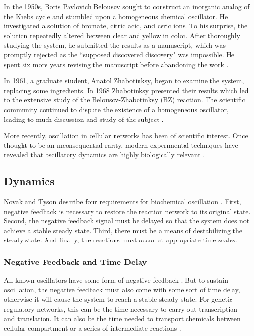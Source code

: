 \documentclass[12pt]{report}
\begin{document}
In the 1950s, Boris Pavlovich Belousov sought to construct an inorganic analog of the Krebs cycle and stumbled upon a homogeneous chemical oscillator. He investigated a solution of bromate, citric acid, and ceric ions. To his surprise, the solution repeatedly altered between clear and yellow in color. After thoroughly studying the system, he submitted the results as a manuscript, which was promptly rejected as the ``supposed discovered discovery" was impossible. He spent six more years revising the manuscript before abandoning the work \cite{epstein_introduction_1998}.

In 1961, a graduate student, Anatol Zhabotinksy, began to examine the system, replacing some ingredients. In 1968 Zhabotinksy presented their results which led to the extensive study of the Belousov-Zhabotinksy (BZ) reaction. The scientific community continued to dispute the existence of a homogeneous oscillator, leading to much discussion and study of the subject \cite{epstein_design_1984}.

More recently, oscillation in cellular networks has been of scientific interest. Once thought to be an inconsequential rarity, modern experimental techniques have revealed that oscillatory dynamics are highly biologically relevant \cite{Sauro_dynamics}.


\subsection{Dynamics}
Novak and Tyson describe four requirements for biochemical oscillation \cite{Novak2008}. First, negative feedback is necessary to restore the reaction network to its original state. Second, the negative feedback signal must be delayed so that the system does not achieve a stable steady state. Third, there must be a means of destabilizing the steady state. And finally, the reactions must occur at appropriate time scales.

\subsubsection{Negative Feedback and Time Delay}
All known oscillators have some form of negative feedback \cite{novak_design_2008, Sharma2006}. But to sustain oscillation, the negative feedback must also come with some sort of time delay, otherwise it will cause the system to reach a stable steady state. For genetic regulatory networks, this can be the time necessary to carry out transcription and translation. It can also be the time needed to transport chemicals between cellular compartment or a series of intermediate reactions \cite{sharma_chemical_2006, Novak2008}.
\end{document}
